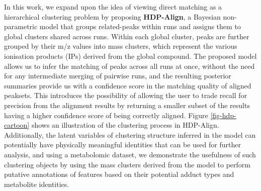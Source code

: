 In this work, we expand upon the idea of viewing direct matching as a hierarchical clustering problem by proposing \textbf{HDP-Align}, a Bayesian non-parametric model that groups related-peaks within runs and assigns them to global clusters shared across runs. Within each global cluster, peaks are further grouped by their m/z values into mass clusters, which represent the various ionisation products (IPs) derived from the global compound. The proposed model allows us to infer the matching of peaks across all runs at once, without the need for any intermediate merging of pairwise runs, and the resulting posterior summaries provide us with a confidence score in the matching quality of aligned peaksets. This introduces the possibility of allowing the user to trade recall for precision from the alignment results by returning a smaller subset of the results having a higher confidence score of being correctly aligned. Figure \ref{fig-hdp-cartoon} shows an illustration of the clustering process in HDP-Align. Additionally, the latent variables of clustering structure inferred in the model can potentially have physically meaningful identities that can be used for further analysis, and using a metabolomic dataset, we demonstrate the usefulness of such clustering objects by using the mass clusters derived from the model to perform putative annotations of features based on their potential adduct types and metabolite identities.

